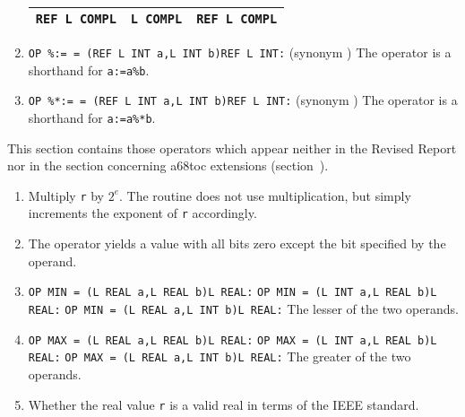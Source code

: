 \begin{enumerate}
\begin{tabular}{|l|l||l|}
  \texttt{REF L COMPL} &\texttt{L COMPL}   &\texttt{REF L COMPL}\\ \hline
\end{tabular} \newline
\item \verb|OP %:= = (REF L INT a,L INT b)REF L INT:|\newline
(synonym )\newline
The operator is a shorthand for \verb|a:=a%b|.
\item \verb|OP %*:= = (REF L INT a,L INT b)REF L INT:|\newline
(synonym )\newline
The operator is a shorthand for \verb|a:=a%*b|.
\end{enumerate}

This section contains those operators which appear neither in the
Revised Report nor in the section concerning a68toc extensions
(section~).
\begin{enumerate}
\item {}\newline
Multiply \verb|r| by $2^e$. The routine does not use multiplication,
but simply increments the exponent of \verb|r| accordingly.
\item {}\newline
The operator yields a value with all bits zero except the bit specified
by the operand.
\item {}
\newline
\verb|OP MIN = (L REAL a,L REAL b)L REAL:| \newline
\verb|OP MIN = (L INT a,L REAL b)L REAL:| \newline
\verb|OP MIN = (L REAL a,L INT b)L REAL:| \newline
The lesser of the two operands.
\item {}
\newline
\verb|OP MAX = (L REAL a,L REAL b)L REAL:| \newline
\verb|OP MAX = (L INT a,L REAL b)L REAL:| \newline
\verb|OP MAX = (L REAL a,L INT b)L REAL:| \newline
The greater of the two operands.
\item {}\newline
Whether the real value \verb|r| is a valid real in terms of the IEEE
standard.
\end{enumerate}

